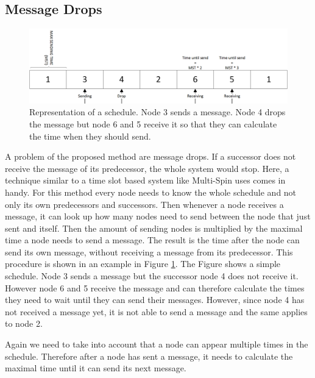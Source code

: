 \subsection{Message Drops}
\label{chp:apr_samplingDrops}
\begin{figure} [htbp]
	\centering         
    \includegraphics[scale=0.6]{content/images/MessageDrop}
    \caption{Representation of a schedule. Node 3 sends a message. Node 4 drops the message but node 6 and 5 receive it so that they can calculate the time when they should send.}
    \label{fig:msgDrop}
\end{figure}
A problem of the proposed method are message drops. If a successor does not receive the message of its predecessor, the whole system would stop. Here, a technique similar to a time slot based system like Multi-Spin uses comes in handy. For this method every node needs to know the whole schedule and not only its own predecessors and successors. Then whenever a node receives a message, it can look up how many nodes need to send between the node that just sent and itself. Then the amount of sending nodes is multiplied by the maximal time a node needs to send a message. The result is the time after the node can send its own message, without receiving a message from its predecessor. This procedure is shown in an example in Figure \ref{fig:msgDrop}. The Figure shows a simple schedule. Node 3 sends a message but the successor node 4 does not receive it. However node 6 and 5 receive the message and can therefore calculate the times they need to wait until they can send their messages. However, since node 4 has not received a message yet, it is not able to send a message and the same applies to node 2. 

Again we need to take into account that a node can appear multiple times in the schedule. Therefore after a node has sent a message, it needs to calculate the maximal time until it can send its next message.